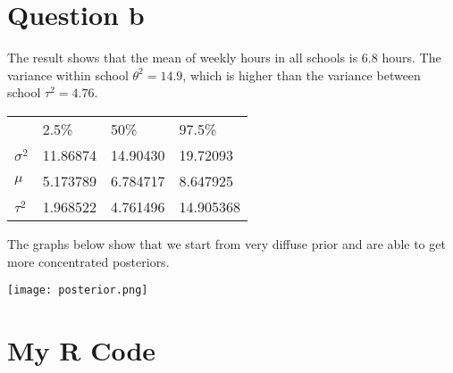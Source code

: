 \documentclass[12pt]{article}
\title{}
\author{}
\date{}
\begin{document}

\section*{Question b}

The result shows that the mean of weekly hours in all schools is 6.8 hours. The variance within school $\theta^{2} = 14.9$, which is higher than the variance between school $\tau^{2}=4.76$.

\begin{center}
\begin{tabular}{llll}
\toprule
& 2.5\% & 50\% & 97.5\% \\
$\sigma^{2}$ & 11.86874 & 14.90430 & 19.72093 \\
$\mu$ & 5.173789 & 6.784717 & 8.647925 \\
$\tau^{2}$ & 1.968522 & 4.761496 & 14.905368 \\
\bottomrule
\end{tabular}
\end{center}

The graphs below show  that we start from very diffuse prior and are able to get more concentrated posteriors.

\begin{center}
\texttt{[image: posterior.png]}
\end{center}

\section*{My R Code}

\end{document}
